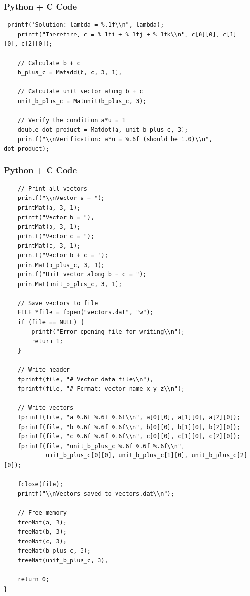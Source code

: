 \documentclass{beamer}
\begin{document}
\begin{frame}[fragile]
    \frametitle{Python + C Code}
    \begin{lstlisting}
 printf("Solution: lambda = %.1f\\n", lambda);
    printf("Therefore, c = %.1fi + %.1fj + %.1fk\\n", c[0][0], c[1][0], c[2][0]);
    
    // Calculate b + c
    b_plus_c = Matadd(b, c, 3, 1);
    
    // Calculate unit vector along b + c
    unit_b_plus_c = Matunit(b_plus_c, 3);
    
    // Verify the condition a*u = 1
    double dot_product = Matdot(a, unit_b_plus_c, 3);
    printf("\\nVerification: a*u = %.6f (should be 1.0)\\n", dot_product);

    \end{lstlisting}
\end{frame}


\begin{frame}[fragile]
    \frametitle{Python + C Code}
    \begin{lstlisting}
    // Print all vectors
    printf("\\nVector a = ");
    printMat(a, 3, 1);
    printf("Vector b = ");
    printMat(b, 3, 1);
    printf("Vector c = ");
    printMat(c, 3, 1);
    printf("Vector b + c = ");
    printMat(b_plus_c, 3, 1);
    printf("Unit vector along b + c = ");
    printMat(unit_b_plus_c, 3, 1);
    
    // Save vectors to file
    FILE *file = fopen("vectors.dat", "w");
    if (file == NULL) {
        printf("Error opening file for writing\\n");
        return 1;
    }
    
    // Write header
    fprintf(file, "# Vector data file\\n");
    fprintf(file, "# Format: vector_name x y z\\n");
    
    // Write vectors
    fprintf(file, "a %.6f %.6f %.6f\\n", a[0][0], a[1][0], a[2][0]);
    fprintf(file, "b %.6f %.6f %.6f\\n", b[0][0], b[1][0], b[2][0]);
    fprintf(file, "c %.6f %.6f %.6f\\n", c[0][0], c[1][0], c[2][0]);
    fprintf(file, "unit_b_plus_c %.6f %.6f %.6f\\n", 
            unit_b_plus_c[0][0], unit_b_plus_c[1][0], unit_b_plus_c[2][0]);
    
    fclose(file);
    printf("\\nVectors saved to vectors.dat\\n");
    
    // Free memory
    freeMat(a, 3);
    freeMat(b, 3);
    freeMat(c, 3);
    freeMat(b_plus_c, 3);
    freeMat(unit_b_plus_c, 3);
    
    return 0;
}
    \end{lstlisting}
\end{frame}
\end{document}
